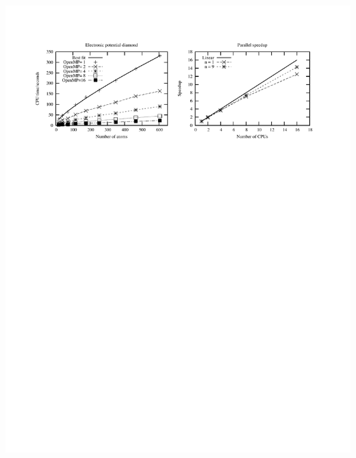 \documentclass[mathserif]{beamer}
\begin{document}
\begin{frame}
\begin{columns}
\begin{column}{.50\textwidth}
\begin{figure}
	\end{figure}
    \end{column}
    \end{columns}    
    \ \\
    \begin{center}
	\includegraphics[scale=0.6, clip, viewport = 50 550 540 730]{figures/ompScaling.pdf}
    \end{center}
\end{frame}
\end{document}
